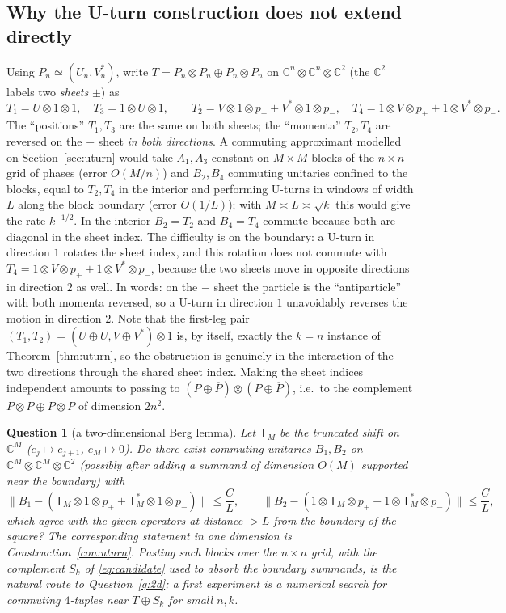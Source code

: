 \documentclass[11pt]{amsart}
\newtheorem{question}[theorem]{Question}
\theoremstyle{definition}
\theoremstyle{remark}
\newcommand{\C}{\mathbb C}
\newcommand{\norm}[1]{\lVert #1\rVert}
\begin{document}
\subsection{Why the U-turn construction does not extend directly}\label{sec:why}

Using $\overline{P_n}\simeq(U_n,V_n^*)$, write $T=P_n\otimes P_n\oplus\overline{P_n}\otimes\overline{P_n}$ on $\C^n\otimes\C^n\otimes\C^2$ (the $\C^2$ labels two \emph{sheets} $\pm$) as
\[
T_1=U\otimes1\otimes1,\quad T_3=1\otimes U\otimes1,\qquad T_2=V\otimes1\otimes p_++V^*\otimes1\otimes p_-,\quad T_4=1\otimes V\otimes p_++1\otimes V^*\otimes p_- .
\]
The ``positions'' $T_1,T_3$ are the same on both sheets; the ``momenta'' $T_2,T_4$ are reversed on the $-$ sheet \emph{in both directions}. A commuting approximant modelled on Section~\ref{sec:uturn} would take $A_1,A_3$ constant on $M\times M$ blocks of the $n\times n$ grid of phases (error $O(M/n)$) and $B_2,B_4$ commuting unitaries confined to the blocks, equal to $T_2,T_4$ in the interior and performing U-turns in windows of width $L$ along the block boundary (error $O(1/L)$); with $M\asymp L\asymp\sqrt k$ this would give the rate $k^{-1/2}$. In the interior $B_2=T_2$ and $B_4=T_4$ commute because both are diagonal in the sheet index. The difficulty is on the boundary: a U-turn in direction $1$ rotates the sheet index, and this rotation does not commute with $T_4=1\otimes V\otimes p_++1\otimes V^*\otimes p_-$, because the two sheets move in opposite directions in direction $2$ as well. In words: on the $-$ sheet the particle is the ``antiparticle'' with both momenta reversed, so a U-turn in direction $1$ unavoidably reverses the motion in direction $2$. Note that the first-leg pair $(T_1,T_2)=(U\oplus U,V\oplus V^*)\otimes1$ is, by itself, exactly the $k=n$ instance of Theorem~\ref{thm:uturn}, so the obstruction is genuinely in the interaction of the two directions through the shared sheet index. Making the sheet indices independent amounts to passing to $(P\oplus\overline P)\otimes(P\oplus\overline P)$, i.e.\ to the complement $P\otimes\overline P\oplus\overline P\otimes P$ of dimension $2n^2$.

\begin{question}[a two-dimensional Berg lemma]\label{q:berg2d}
Let $\mathsf T_M$ be the truncated shift on $\C^M$ ($e_j\mapsto e_{j+1}$, $e_{M}\mapsto0$). Do there exist commuting unitaries $B_1,B_2$ on $\C^M\otimes\C^M\otimes\C^2$ (possibly after adding a summand of dimension $O(M)$ supported near the boundary) with
\[
\norm{B_1-(\mathsf T_M\otimes1\otimes p_++\mathsf T_M^*\otimes1\otimes p_-)}\le\frac CL,\qquad \norm{B_2-(1\otimes\mathsf T_M\otimes p_++1\otimes\mathsf T_M^*\otimes p_-)}\le\frac CL,
\]
which agree with the given operators at distance $>L$ from the boundary of the square? The corresponding statement in one dimension is Construction~\ref{con:uturn}. Pasting such blocks over the $n\times n$ grid, with the complement $S_k$ of \eqref{eq:candidate} used to absorb the boundary summands, is the natural route to Question~\ref{q:2d}; a first experiment is a numerical search for commuting $4$-tuples near $T\oplus S_k$ for small $n,k$.
\end{question}
\end{document}
